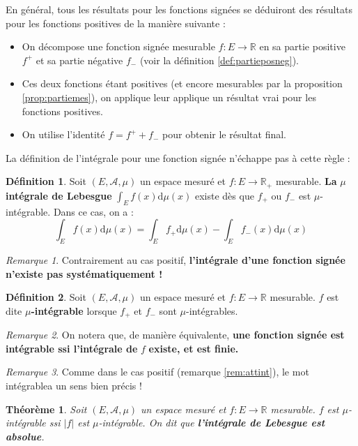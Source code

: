 \documentclass[french]{report}
\theoremstyle{plain}
\newtheorem{thm}{Théorème}[section]
\theoremstyle{definition}
\newtheorem{defi}{Définition}[section]
\theoremstyle{remark}
\newtheorem{rem}{Remarque}[section]
\newcommand\itemb{\item[$\bullet$]}
\begin{document}
En général, tous les résultats pour les fonctions signées se déduiront des résultats pour les fonctions positives de la manière suivante :
\begin{itemize}
  \itemb On décompose une fonction signée mesurable $f:E\longrightarrow\mathbb{R}$ en sa partie positive $f^+$ et sa partie négative $f_-$ (voir la définition \ref{def:partieposneg}).
  \itemb Ces deux fonctions étant positives (et encore mesurables par la proposition \ref{prop:partiemes}), on applique leur applique un résultat vrai pour les fonctions positives.
  \itemb On utilise l'identité $f=f^++f_-$ pour obtenir le résultat final.
\end{itemize}

La définition de l'intégrale pour une fonction signée n'échappe pas à cette règle :

\begin{defi}
  Soit $\left(E,\mathcal{A},\mu\right)$ un espace mesuré et $f:E\rightarrow\mathbb{R}_+$ mesurable.
  \textbf{La} $\mu$ \textbf{intégrale de Lebesgue} $\displaystyle\int_E f(x) \text{d}\mu(x)$ existe dès que $f_+$ ou $f_-$ est $\mu$-intégrable.
  Dans ce cas, on a :
  $$
  \int_E f(x) \text{d}\mu(x)=\int_Ef_+\text{d}\mu(x) - \int_Ef_-(x)\text{d}\mu(x)
  $$
\end{defi}

\begin{rem}
  Contrairement au cas positif, \textbf{l'intégrale d'une fonction signée n'existe pas systématiquement !}
\end{rem}

\begin{defi}
  Soit $\left(E,\mathcal{A},\mu\right)$ un espace mesuré et $f:E\rightarrow\mathbb{R}$ mesurable.
  $f$ est dite $\mu$\textbf{-intégrable} lorsque $f_+$ et $f_-$ sont $\mu$-intégrables.
\end{defi}

\begin{rem}
  On notera que, de manière équivalente, \textbf{une fonction signée est intégrable ssi l'intégrale de} $f$ \textbf{existe, et est finie.}
\end{rem}

\begin{rem}
  Comme dans le cas positif (remarque \ref{rem:attint}), le mot \og intégrable\fg a un sens bien précis !
\end{rem}

\begin{thm}
  Soit $\left(E, \mathcal{A}, \mu\right)$ un espace mesuré et $f:E\longrightarrow\mathbb{R}$ mesurable. $f$ est $\mu$-intégrable ssi $\left|f\right|$ est $\mu$-intégrable.
  On dit que \textbf{l'intégrale de Lebesgue est absolue}.
\end{thm}
\end{document}

